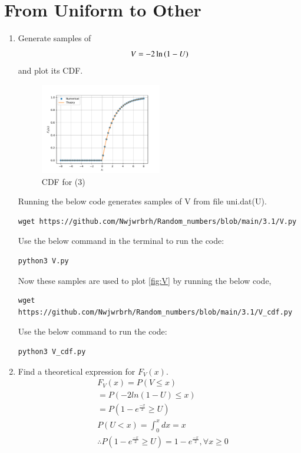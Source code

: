 \documentclass[journal,12pt,twocolumn]{IEEEtran}
\renewcommand\thesection{\arabic{section}}
\begin{document}
\section{From Uniform to Other}
\begin{enumerate}[label=\thesection.\arabic*
,ref=\thesection.\theenumi]
%
\item
Generate samples of 
%
\begin{equation}
V = -2\ln\left(1-U\right)
\end{equation}
%
and plot its CDF.\\ 
\begin{figure}[h]
\includegraphics[width=0.5\textwidth]{../3.1/V_cdf.pdf}
\caption{CDF for (3)}
\label{fig:V}
\end{figure}
 
\solution
Running the below code generates samples of V from file uni.dat(U).
\begin{lstlisting}
wget https://github.com/Nwjwrbrh/Random_numbers/blob/main/3.1/V.py
\end{lstlisting}
Use the below command in the terminal to run the code:
\begin{lstlisting}
python3 V.py
\end{lstlisting}
Now these samples are used to plot \eqref{fig:V} by running the below code,
\begin{lstlisting}
wget https://github.com/Nwjwrbrh/Random_numbers/blob/main/3.1/V_cdf.py
\end{lstlisting}
Use the below command to run the code:
\begin{lstlisting}
python3 V_cdf.py
\end{lstlisting}
\item Find a theoretical expression for $F_V(x)$.
\begin{align}
 &F_{V}(x)=P(V \leq x)\\
 &=P(-2 ln(1-U) \leq x)\\
 &=P(1-e^{\frac{-x}{2}} \geq U)\\
 &P(U<x)=\int_{0}^{x} dx=x\\
 &\therefore P(1-e^{\frac{-x}{2}} \geq U)=1-e^{\frac{-x}{2}}, \forall x\geq 0 \\ 
 \nonumber
\end{align}
\end{enumerate}
\end{document}
